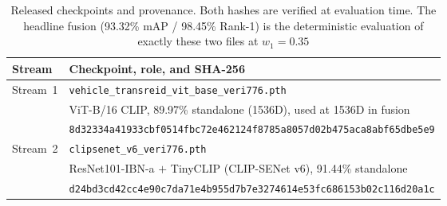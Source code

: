 \begin{table}[!t]
  \centering
  \caption{Released checkpoints and provenance. Both hashes are verified at evaluation time. The headline fusion (93.32\% mAP / 98.45\% Rank-1) is the
  deterministic evaluation of exactly these two files at $w_1{=}0.35$}
  \label{tab:repro}
  \small
  \begin{tabular}{L{2.2cm}L{11.6cm}}
    \toprule
    Stream & Checkpoint, role, and SHA-256 \\
    \midrule
    Stream~1 & \texttt{vehicle\_transreid\_vit\_base\_veri776.pth} \\
             & ViT-B/16 CLIP, 89.97\% standalone (1536D), used at 1536D in
               fusion \\
             & {\scriptsize\texttt{8d32334a41933cbf0514fbc72e462124f8785a8057d02b475aca8abf65dbe5e9}} \\
    \midrule
    Stream~2 & \texttt{clipsenet\_v6\_veri776.pth} \\
             & ResNet101-IBN-a $+$ TinyCLIP (CLIP-SENet v6), 91.44\%
               standalone \\
             & {\scriptsize\texttt{d24bd3cd42cc4e90c7da71e4b955d7b7e3274614e53fc686153b02c116d20a1c}} \\
    \bottomrule
  \end{tabular}
\end{table}
